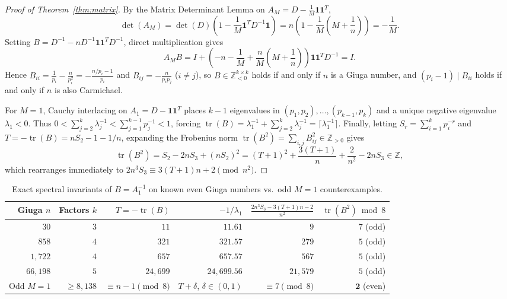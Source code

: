 \documentclass[11pt]{amsart}
\theoremstyle{definition}
\theoremstyle{remark}
\numberwithin{equation}{section}
\begin{document}
\begin{proof}[Proof of Theorem~\ref{thm:matrix}]
By the Matrix Determinant Lemma on $A_M = D - \frac{1}{M}\mathbf{1}\mathbf{1}^T$,
\[
    \det(A_M) = \det(D)\left(1 - \frac{1}{M}\mathbf{1}^T D^{-1}\mathbf{1}\right) = n\left(1 - \frac{1}{M}\left(M + \frac{1}{n}\right)\right) = -\frac{1}{M}.
\]
Setting $B = D^{-1} - n D^{-1}\mathbf{1}\mathbf{1}^T D^{-1}$, direct multiplication gives
\[
    A_M B = I + \left(-n - \frac{1}{M} + \frac{n}{M}\left(M + \frac{1}{n}\right)\right)\mathbf{1}\mathbf{1}^T D^{-1} = I.
\]
Hence $B_{ii} = \frac{1}{p_i} - \frac{n}{p_i^2} = -\frac{n/p_i - 1}{p_i}$ and $B_{ij} = -\frac{n}{p_i p_j}$ ($i \neq j$), so $B \in \mathbb{Z}_{<0}^{k \times k}$ holds if and only if $n$ is a Giuga number, and $(p_i - 1) \mid B_{ii}$ holds if and only if $n$ is also Carmichael.

For $M = 1$, Cauchy interlacing on $A_1 = D - \mathbf{1}\mathbf{1}^T$ places $k - 1$ eigenvalues in $(p_1, p_2), \dots, (p_{k-1}, p_k)$ and a unique negative eigenvalue $\lambda_1 < 0$. Thus $0 < \sum_{j=2}^k \lambda_j^{-1} < \sum_{j=1}^{k-1} p_j^{-1} < 1$, forcing $\operatorname{tr}(B) = \lambda_1^{-1} + \sum_{j=2}^k \lambda_j^{-1} = \lceil \lambda_1^{-1} \rceil$. Finally, letting $S_r = \sum_{i=1}^k p_i^{-r}$ and $T = -\operatorname{tr}(B) = n S_2 - 1 - 1/n$, expanding the Frobenius norm $\operatorname{tr}(B^2) = \sum_{i,j} B_{ij}^2 \in \mathbb{Z}_{>0}$ gives
\[
    \operatorname{tr}(B^2) = S_2 - 2n S_3 + (n S_2)^2 = (T + 1)^2 + \frac{3(T+1)}{n} + \frac{2}{n^2} - 2n S_3 \in \mathbb{Z},
\]
which rearranges immediately to $2n^3 S_3 \equiv 3(T+1)n + 2 \pmod{n^2}$.
\end{proof}

\begin{table}[h]
\centering
\caption{Exact spectral invariants of $B = A_1^{-1}$ on known even Giuga numbers vs.\ odd $M=1$ counterexamples.}
\label{tab:spectral}
\begin{tabular}{@{}rrrrrr@{}}
\hline\hline
Giuga $n$ & Factors $k$ & $T = -\operatorname{tr}(B)$ & $-1/\lambda_1$ & $\frac{2n^3 S_3 - 3(T+1)n - 2}{n^2}$ & $\operatorname{tr}(B^2) \bmod 8$ \\
\hline
$30$     & $3$ & $11$     & $11.61$    & $9$      & $7$ (odd) \\
$858$    & $4$ & $321$    & $321.57$   & $279$    & $5$ (odd) \\
$1{,}722$& $4$ & $657$    & $657.57$   & $567$    & $5$ (odd) \\
$66{,}198$& $5$ & $24{,}699$ & $24{,}699.56$ & $21{,}579$ & $5$ (odd) \\
\hline
Odd $M=1$ & $\ge 8{,}138$ & $\equiv n-1 \pmod 8$ & $T + \delta$, $\delta \in (0,1)$ & $\equiv 7 \pmod 8$ & $\mathbf{2}$ (even) \\
\hline\hline
\end{tabular}
\end{table}
\end{document}
